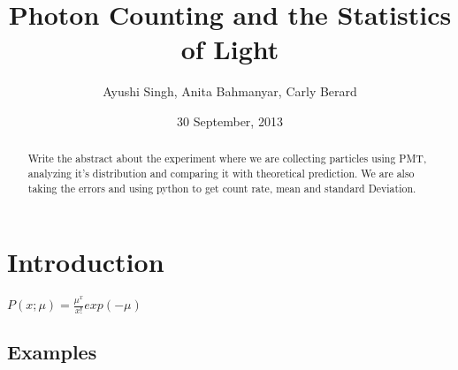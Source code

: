 \documentclass[a4paper,12pt]{article}
\begin{document}
\onehalfspacing
\title{Photon Counting and the Statistics of Light}
\author{Ayushi Singh, Anita Bahmanyar, Carly Berard}
\date{30 September, 2013}
\maketitle

\begin{abstract}
\label{abstract}
Write the abstract about the experiment where we are collecting particles using PMT, analyzing it's distribution and comparing it with theoretical prediction. We are also taking the errors and using python to get count rate, mean and standard Deviation.
\end{abstract}

\section{Introduction}
\label{sec:introduction}
$P(x;\mu)=\frac{\mu^x}{x!}exp(-\mu)$



\subsection{Examples}
\label{sec:ex}


\end{document}

